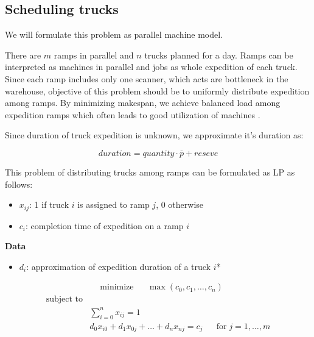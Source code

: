 \documentclass{ctuthesis}
\begin{document}
 \subsection{Scheduling trucks}
 
 We will formulate this problem as parallel machine model.
 
 There are $m$ ramps in parallel and $n$ trucks planned for a day. Ramps can be interpreted as machines in parallel and jobs as whole expedition of each truck. Since each ramp includes only one scanner, which acts are bottleneck in the warehouse, objective of this problem should be to uniformly distribute expedition among ramps. By minimizing makespan, we achieve balanced load among expedition ramps which often leads to good utilization of machines \cite{pinedo}. 
 
 Since duration of truck expedition is unknown, we approximate it's duration as:
 
 \begin{equation}
     duration = quantity \cdot \overline{p} + reseve
 \end{equation}
 
 This problem of distributing trucks among ramps can be formulated as LP as follows:
 
\begin{itemize}
\item $x_{ij}$: 1 if truck $i$ is assigned to ramp $j$, 0 otherwise
\item$c_i$: completion time of expedition on a ramp $i$
\end{itemize}
\textbf{Data}
\begin{itemize}
\item$d_i$: approximation of expedition duration of a truck $i$*
\end{itemize}

\begin{equation}
\begin{aligned}
&\text{minimize}
&&\max(c_0, c_1, \ldots, c_n)
\end{aligned}
\end{equation}
\begin{equation}
\begin{aligned}
\text{subject to}\\
& \sum_{i=0}^{n} x_{ij} = 1 &&\\
& d_0x_{i0} + d_1x_{0j} + \ldots + d_nx_{nj} = c_j && \text{for}\; j = 1, \ldots, m\\
\end{aligned}
\end{equation}
 
\end{document}
